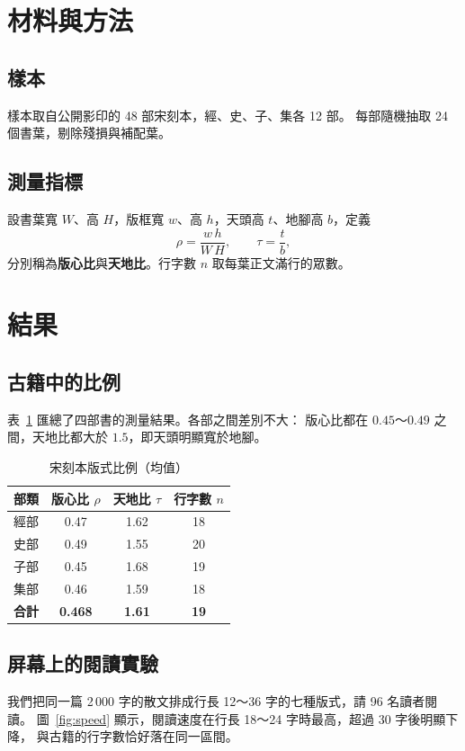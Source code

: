\documentclass[UTF8,zihao=-4]{ctexart}
\begin{document}
\section{材料與方法}

\subsection{樣本}
樣本取自公開影印的 48 部宋刻本，經、史、子、集各 12 部\cite{zhou2019}。
每部隨機抽取 24 個書葉，剔除殘損與補配葉。

\subsection{測量指標}
設書葉寬 $W$、高 $H$，版框寬 $w$、高 $h$，天頭高 $t$、地腳高 $b$，定義
\begin{equation}
  \label{eq:ratio}
  \rho = \frac{w\,h}{W\,H}, \qquad \tau = \frac{t}{b},
\end{equation}
分別稱為\textbf{版心比}與\textbf{天地比}。行字數 $n$ 取每葉正文滿行的眾數。

\section{結果}

\subsection{古籍中的比例}
表~\ref{tab:ratio} 匯總了四部書的測量結果。各部之間差別不大：
版心比都在 $0.45$～$0.49$ 之間，天地比都大於 $1.5$，即天頭明顯寬於地腳。

\begin{table}[htbp]
  \centering
  \caption{宋刻本版式比例（均值）}
  \label{tab:ratio}
  \begin{tabular}{@{}l c c c@{}}
    \toprule
    部類 & 版心比 $\rho$ & 天地比 $\tau$ & 行字數 $n$ \\
    \midrule
    經部 & 0.47 & 1.62 & 18 \\
    史部 & 0.49 & 1.55 & 20 \\
    子部 & 0.45 & 1.68 & 19 \\
    集部 & 0.46 & 1.59 & 18 \\
    \midrule
    \textbf{合計} & \textbf{0.468} & \textbf{1.61} & \textbf{19} \\
    \bottomrule
  \end{tabular}
\end{table}

\subsection{屏幕上的閱讀實驗}
我們把同一篇 2\,000 字的散文排成行長 12～36 字的七種版式，請 96 名讀者閱讀。
圖~\ref{fig:speed} 顯示，閱讀速度在行長 18～24 字時最高，超過 30 字後明顯下降，
與古籍的行字數恰好落在同一區間。
\end{document}

